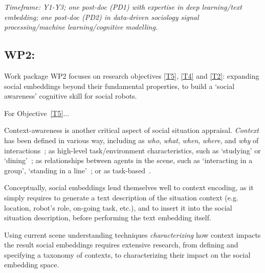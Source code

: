\vspace{1em}
\noindent\emph{ Timeframe: Y1-Y3; one post-doc (PD1) with expertise in
    deep learning/text embedding; one post-doc (PD2) in data-driven sociology
signal processing/machine learning/cognitive modelling.}


\subsection{WP2: \textbf{\wpTwo}} 

Work package WP2 focuses on research objectives \ref{T5}, \ref{T4} and \ref{T2}: expanding
social embeddings beyond their fundamental properties, to build a `social
awareness' cognitive skill for social robots.





For Objective~\ref{T5}...

Context-awareness is another critical aspect of social situation appraisal.
\emph{Context} has been defined in various way, including as \emph{who},
\emph{what}, \emph{when}, \emph{where}, and \emph{why} of
interactions~\cite{vinciarelli2009social}; as high-level task/environment
characteristics, such as `studying' or `dining'~\cite{nigam2015social}; as
relationships between agents in the scene, such as `interacting in a group',
`standing in a line'~\cite{althaus2004navigation}; or as
task-based~\cite{castellano2012detecting}.

Conceptually, social embeddings lend themselves well to context encoding, as it
simply requires to generate a text description of the situation context (e.g.
location, robot's role, on-going task, etc.), and to insert it into the
social situation description, before performing the text embedding itself.

Using current scene understanding techniques \emph{characterizing} how context impacts the result social embeddings
requires extensive research, from defining and specifying a taxonomy of
contexts, to characterizing their impact on the social embedding space.

